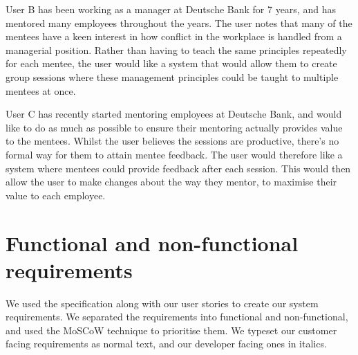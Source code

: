 \documentclass[10pt]{article}
\begin{document}
User B has been working as a manager at Deutsche Bank for 7 years, and has
mentored many employees throughout the years. The user notes that many of the
mentees have a keen interest in how conflict in the workplace is handled from a
managerial position. Rather than having to teach the same principles repeatedly
for each mentee, the user would like a system that would allow them to create
group sessions where these management principles could be taught to multiple
mentees at once.

User C has recently started mentoring employees at Deutsche Bank, and would like
to do as much as possible to ensure their mentoring actually provides value to
the mentees. Whilst the user believes the sessions are productive, there's no
formal way for them to attain mentee feedback. The user would therefore like a
system where mentees could provide feedback after each session. This would then
allow the user to make changes about the way they mentor, to maximise their
value to each employee.


\vspace{-4mm}\section{Functional and non-functional requirements}\vspace{-2mm}
We used the specification along with our user stories to create our system
requirements. We separated the requirements into functional and non-functional,
and used the MoSCoW technique to prioritise them. We typeset our customer facing
requirements as normal text, and our developer facing ones in italics.
\end{document}
